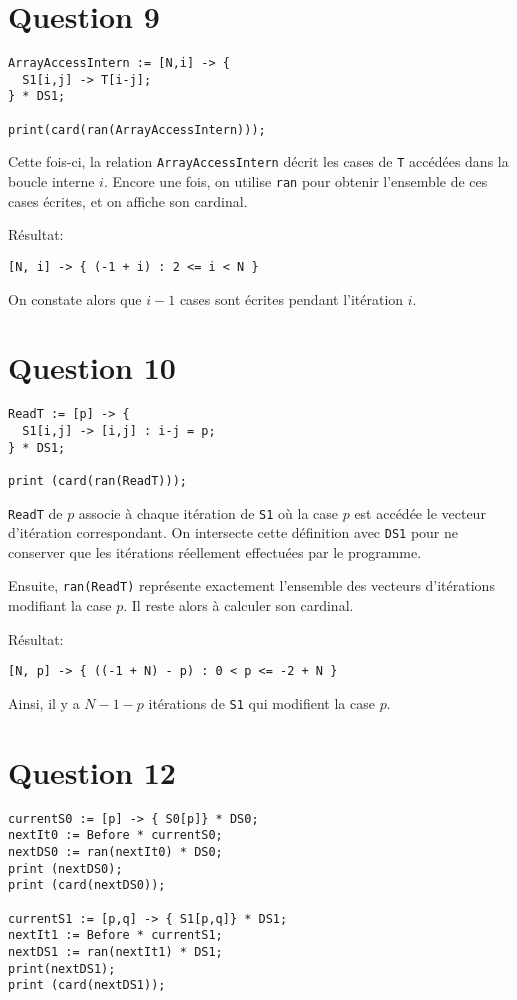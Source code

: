 \documentclass{article}
\begin{document}
\section*{Question 9}

\begin{lstlisting}
ArrayAccessIntern := [N,i] -> {
  S1[i,j] -> T[i-j];
} * DS1;

print(card(ran(ArrayAccessIntern)));
\end{lstlisting}

Cette fois-ci, la relation \lstinline{ArrayAccessIntern} décrit les cases de \lstinline{T} accédées dans la boucle interne $i$.
Encore une fois, on utilise \lstinline{ran} pour obtenir l'ensemble de ces cases écrites, et on affiche son cardinal.

Résultat:
\begin{lstlisting}
[N, i] -> { (-1 + i) : 2 <= i < N }
\end{lstlisting}

On constate alors que $i-1$ cases sont écrites pendant l'itération $i$.

\section*{Question 10}

\begin{lstlisting}
ReadT := [p] -> {
  S1[i,j] -> [i,j] : i-j = p;
} * DS1;

print (card(ran(ReadT)));
\end{lstlisting}

\lstinline{ReadT} de $p$ associe à chaque itération de \lstinline{S1} où la case $p$ est accédée le vecteur d'itération correspondant.
On intersecte cette définition avec \lstinline{DS1} pour ne conserver que les itérations réellement effectuées par le programme.

Ensuite, \lstinline{ran(ReadT)} représente exactement l'ensemble des vecteurs d'itérations modifiant la case $p$. Il reste alors à calculer son cardinal.

Résultat:
\begin{lstlisting}
[N, p] -> { ((-1 + N) - p) : 0 < p <= -2 + N }
\end{lstlisting}

Ainsi, il y a $N-1-p$ itérations de \lstinline{S1} qui modifient la case $p$.

\section*{Question 12}
\begin{lstlisting}
currentS0 := [p] -> { S0[p]} * DS0;
nextIt0 := Before * currentS0;
nextDS0 := ran(nextIt0) * DS0;
print (nextDS0);
print (card(nextDS0));

currentS1 := [p,q] -> { S1[p,q]} * DS1;
nextIt1 := Before * currentS1;
nextDS1 := ran(nextIt1) * DS1;
print(nextDS1);
print (card(nextDS1));
\end{lstlisting}
\end{document}
